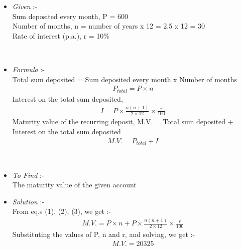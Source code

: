 \documentclass[journal,12pt,twocolumn]{IEEEtran}
\begin{document}
\solution
\begin{itemize}

    \item \emph{Given} :-
                \\
                Sum deposited every month, P = 600
                \\
                Number of months, n = number of years x 12 = 2.5 x 12 = 30
                \\
                Rate of interest (p.a.), r = 10\%
                \\
    		\begin{table}[ht!]
			\\
			\caption{}
		\end{table}
    \item \emph{Formula} :-
                \\
                Total sum deposited = Sum deposited every month x Number of months
                \begin{align}
                    P_{total} = P \times n
                \end{align}
                Interest on the total sum deposited,
                \begin{align}
                    I = P \times \frac{n(n + 1)}{2 \times 12} \times \frac{r}{100}
                \end{align}
                Maturity value of the recurring deposit, M.V. = Total sum deposited + Interest on the total sum deposited
                \begin{align}
                    M.V. = P_{total} + I
                \end{align}
		\begin{table}[ht!]
			\\
			\caption{}
		\end{table}

    \item \emph{To Find} :-
                \\
                The maturity value of the given account
                \\

    \item \emph{Solution} :-
                \\
                From eq.s (1), (2), (3), we get :-
                \begin{align}
                    M.V. = P \times n + P \times \frac{n(n + 1)}{2 \times 12} \times \frac{r}{100}
                \end{align}
                Substituting the values of P, n and r, and solving, we get :-
                \begin{align}
                    M.V. = 20325
                \end{align}

\end{itemize}
\end{document}
